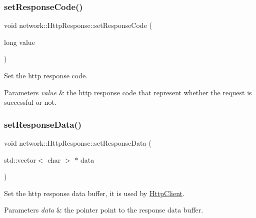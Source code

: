 \subsubsection{\texorpdfstring{set\+Response\+Code()}{setResponseCode()}\hspace{0.1cm}{\footnotesize\ttfamily [2/2]}}
{\footnotesize\ttfamily void network\+::\+Http\+Response\+::set\+Response\+Code (\begin{DoxyParamCaption}\item[{long}]{value }\end{DoxyParamCaption})\hspace{0.3cm}{\ttfamily [inline]}}

Set the http response code. 
\begin{DoxyParams}{Parameters}
{\em value} & the http response code that represent whether the request is successful or not. \\
\hline
\end{DoxyParams}
\mbox{\label{classnetwork_1_1HttpResponse_ae53dc439344a00b7af4c5ffd1d4ad3bd}} 
\subsubsection{\texorpdfstring{set\+Response\+Data()}{setResponseData()}\hspace{0.1cm}{\footnotesize\ttfamily [1/2]}}
{\footnotesize\ttfamily void network\+::\+Http\+Response\+::set\+Response\+Data (\begin{DoxyParamCaption}\item[{std\+::vector$<$ char $>$ $\ast$}]{data }\end{DoxyParamCaption})\hspace{0.3cm}{\ttfamily [inline]}}

Set the http response data buffer, it is used by \hyperlink{classnetwork_1_1HttpClient}{Http\+Client}. 
\begin{DoxyParams}{Parameters}
{\em data} & the pointer point to the response data buffer. \\
\hline
\end{DoxyParams}
\mbox{\label{classnetwork_1_1HttpResponse_ae53dc439344a00b7af4c5ffd1d4ad3bd}} 
